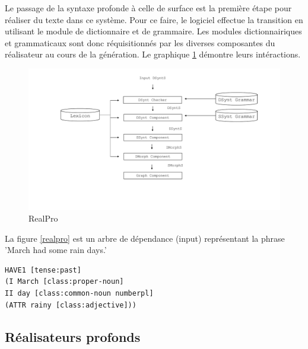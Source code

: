 Le passage de la syntaxe profonde à celle de surface est la première étape pour réaliser du texte dans ce système. Pour ce faire, le logiciel effectue la transition en utilisant le module de dictionnaire et de grammaire. Les modules dictionnairiques et grammaticaux sont donc réquisitionnés par les diverses composantes du réalisateur au cours de la génération. Le graphique \ref{fig:RealPro} démontre leurs intéractions. 
\begin{figure}[htb]
	\centering
	\includegraphics[width=1\textwidth, trim = {0cm 0cm 0cm 0cm},clip]{ch2/figs/realpro.pdf}
	\caption{RealPro}
	\label{fig:RealPro}
\end{figure}

La figure \ref{realpro} est un arbre de dépendance (input) représentant la phrase  'March had some rain days.'
\begin{lstlisting}[language=Xml, caption=Input, label=realpro]
HAVE1 [tense:past]
(I March [class:proper-noun]
II day [class:common-noun numberpl]
(ATTR rainy [class:adjective]))
\end{lstlisting}



\subsection{Réalisateurs profonds}

